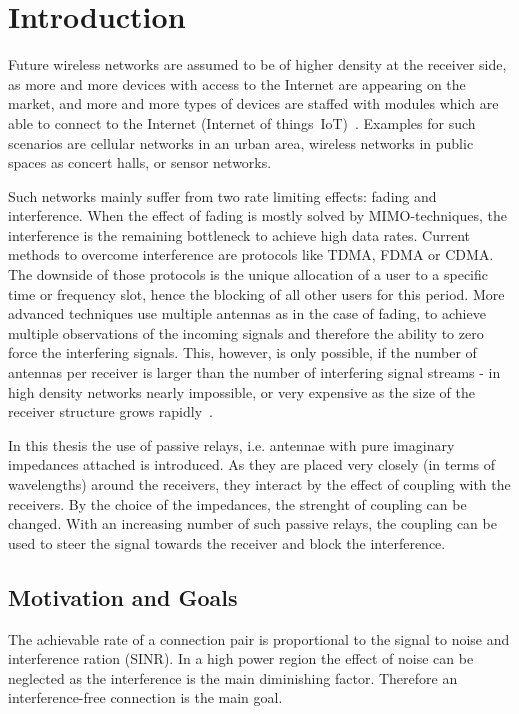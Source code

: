 \chapter{Introduction}
\label{sec:introduction}

Future wireless networks are assumed to be of higher density at the receiver side, as more and more devices with access to the Internet are appearing on the market, and more and more types of devices are staffed with modules which are able to connect to the Internet (Internet of things~IoT)~\cite{rusek13}.
Examples for such scenarios are cellular networks in an urban area, wireless networks in public spaces as concert halls, or sensor networks.

Such networks mainly suffer from two rate limiting  effects: fading and interference.
When the effect of fading is mostly solved by MIMO-techniques, the interference is the remaining bottleneck to achieve high data rates.
Current methods to overcome interference are protocols like TDMA, FDMA or CDMA.
The downside of those protocols is the unique allocation of a user to a specific time or frequency slot, hence the blocking of all other users for this period.
More advanced techniques use multiple antennas as in the case of fading, to achieve multiple observations of the incoming signals and therefore the ability to zero force the interfering signals.
This, however, is only possible, if the number of antennas per receiver is larger than the number of interfering signal streams - in high density networks nearly impossible, or very expensive as the size of the receiver structure grows rapidly~\cite{rusek13}.

In this thesis the use of passive relays, i.e. antennae with pure imaginary impedances attached is introduced.
As they are placed very closely (in terms of wavelengths) around the receivers, they interact by the effect of coupling with the receivers.
By the choice of the impedances, the strenght of coupling can be changed.
With an increasing number of such passive relays, the coupling can be used to steer the signal towards the receiver and block the interference.

\section{Motivation and Goals}
\label{sec:motivation}

The achievable rate of a connection pair is proportional to the signal to noise and interference ration (SINR).
In a high power region the effect of noise can be neglected as the interference is the main diminishing factor.
Therefore an interference-free connection is the main goal.

